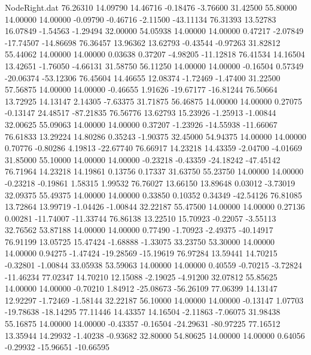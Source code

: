 \begin{filecontents}{NodeRight.dat}
  76.26310   14.09790   14.46716    -0.18476   -3.76600   31.42500   55.80000   14.00000   14.00000   -0.09790   -0.46716   -2.11500  -43.11134
  76.31393   13.52783   16.07849    -1.54563   -1.29494   32.00000   54.05938   14.00000   14.00000    0.47217   -2.07849  -17.74507  -14.86698
  76.36457   13.96362   13.62793    -0.43544   -0.97263   31.82812   55.44062   14.00000   14.00000    0.03638    0.37207   -4.98205  -11.12818
  76.41534   14.16504   13.42651    -1.76050   -4.66131   31.58750   56.11250   14.00000   14.00000   -0.16504    0.57349  -20.06374  -53.12306
  76.45604   14.46655   12.08374    -1.72469   -1.47400   31.22500   57.56875   14.00000   14.00000   -0.46655    1.91626  -19.67177  -16.81244
  76.50664   13.72925   14.13147     2.14305   -7.63375   31.71875   56.46875   14.00000   14.00000    0.27075   -0.13147   24.48517  -87.21835
  76.56776   13.62793   15.23926    -1.25913   -1.00844   32.00625   55.09063   14.00000   14.00000    0.37207   -1.23926  -14.55938  -11.66067
  76.61833   13.29224   14.80286     0.35243   -1.90375   32.45000   54.94375   14.00000   14.00000    0.70776   -0.80286    4.19813  -22.67740
  76.66917   14.23218   14.43359    -2.04700   -4.01669   31.85000   55.10000   14.00000   14.00000   -0.23218   -0.43359  -24.18242  -47.45142
  76.71964   14.23218   14.19861     0.13756    0.17337   31.63750   55.23750   14.00000   14.00000   -0.23218   -0.19861    1.58315    1.99532
  76.76027   13.66150   13.89648     0.03012   -3.73019   32.09375   55.49375   14.00000   14.00000    0.33850    0.10352    0.34349  -42.54126
  76.81085   13.72864   13.99719    -1.04426   -1.00844   32.22187   55.47500   14.00000   14.00000    0.27136    0.00281  -11.74007  -11.33744
  76.86138   13.22510   15.70923    -0.22057   -3.55113   32.76562   53.87188   14.00000   14.00000    0.77490   -1.70923   -2.49375  -40.14917
  76.91199   13.05725   15.47424    -1.68888   -1.33075   33.23750   53.30000   14.00000   14.00000    0.94275   -1.47424  -19.28569  -15.19619
  76.97284   13.59441   14.70215    -0.32801   -1.00844   33.05938   53.59063   14.00000   14.00000    0.40559   -0.70215   -3.72824  -11.46234
  77.02347   14.70210   12.15088    -2.19025   -4.91200   32.07812   55.85625   14.00000   14.00000   -0.70210    1.84912  -25.08673  -56.26109
  77.06399   14.13147   12.92297    -1.72469   -1.58144   32.22187   56.10000   14.00000   14.00000   -0.13147    1.07703  -19.78638  -18.14295
  77.11446   14.43357   14.16504    -2.11863   -7.06075   31.98438   55.16875   14.00000   14.00000   -0.43357   -0.16504  -24.29631  -80.97225
  77.16512   13.35944   14.29932    -1.40238   -0.93682   32.80000   54.80625   14.00000   14.00000    0.64056   -0.29932  -15.96651  -10.66595

\end{filecontents}
